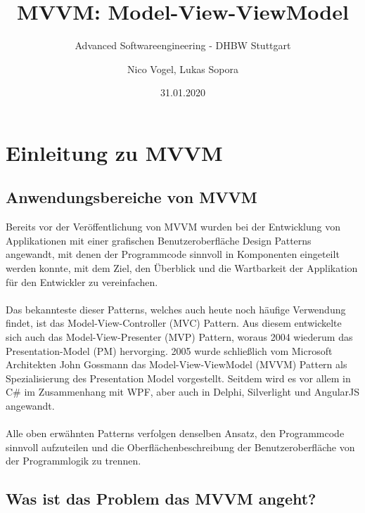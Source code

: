 \documentclass[titlepage=false,12pt]{scrreprt}
\title{MVVM: Model-View-ViewModel}
\subtitle{Advanced Softwareengineering - DHBW Stuttgart}
\author{Nico Vogel, Lukas Sopora}
\date{31.01.2020}
\begin{document}
\maketitle
	
{\renewcommand\clearpage\relax
	\tableofcontents}
\newpage

\chapter{Einleitung zu MVVM}

\section{Anwendungsbereiche von MVVM}

Bereits vor der Veröffentlichung von MVVM wurden bei der Entwicklung von Applikationen mit einer grafischen Benutzeroberfläche Design Patterns angewandt, 
mit denen der Programmcode sinnvoll in Komponenten eingeteilt werden konnte, mit dem Ziel, den Überblick und die Wartbarkeit der Applikation für den Entwickler zu vereinfachen.
\\\\
\noindent
Das bekannteste dieser Patterns, welches auch heute noch häufige Verwendung findet, ist das Model-View-Controller (MVC) Pattern.
Aus diesem entwickelte sich auch das Model-View-Presenter (MVP) Pattern, woraus 2004 wiederum das Presentation-Model (PM) hervorging.
2005 wurde schließlich vom Microsoft Architekten John Gossmann das Model-View-ViewModel (MVVM) Pattern als Spezialisierung des Presentation Model vorgestellt.
Seitdem wird es vor allem in C\# im Zusammenhang mit WPF, aber auch in Delphi, Silverlight und AngularJS angewandt.
\\\\
\noindent
Alle oben erwähnten Patterns verfolgen denselben Ansatz, den Programmcode sinnvoll aufzuteilen und die Oberflächenbeschreibung der Benutzeroberfläche von der Programmlogik zu trennen. \par

\section{Was ist das Problem das MVVM angeht?}
\end{document}
